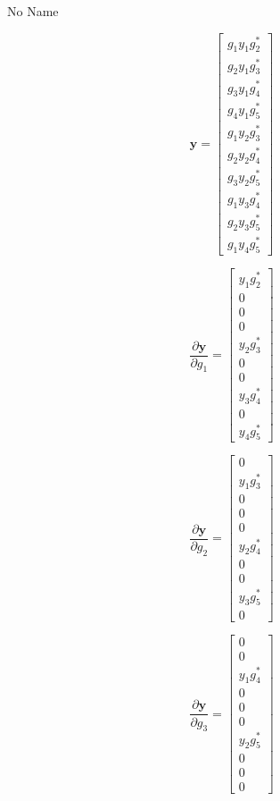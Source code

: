 \documentclass[a4paper,10pt]{article}
\begin{document}
\begin{section}{No Name}

\begin{equation}
\boldsymbol{y} = 
\begin{bmatrix}
 g_1 y_1 g_2^*\\
 g_2 y_1 g_3^*\\
 g_3 y_1 g_4^*\\
 g_4 y_1 g_5^*\\
 g_1 y_2 g_3^*\\
 g_2 y_2 g_4^*\\
 g_3 y_2 g_5^*\\
 g_1 y_3 g_4^*\\
 g_2 y_3 g_5^*\\
 g_1 y_4 g_5^*
\end{bmatrix}
\end{equation}

\begin{equation}
\frac{\partial\boldsymbol{y}}{\partial g_1} = 
\begin{bmatrix}
 y_1 g_2^*\\
 0\\
 0\\
 0\\
 y_2 g_3^*\\
 0\\
 0\\
 y_3 g_4^*\\
 0\\
 y_4 g_5^*
\end{bmatrix}
\end{equation}


\begin{equation}
\frac{\partial\boldsymbol{y}}{\partial g_2} = 
\begin{bmatrix}
 0\\
 y_1 g_3^*\\
 0\\
 0\\
 0\\
 y_2 g_4^*\\
 0\\
 0\\
 y_3 g_5^*\\
 0
\end{bmatrix}
\end{equation}

\begin{equation}
\frac{\partial\boldsymbol{y}}{\partial g_3} =  
\begin{bmatrix}
 0\\
 0\\
 y_1 g_4^*\\
 0\\
 0\\
 0\\
 y_2 g_5^*\\
 0\\
 0\\
 0
\end{bmatrix}
\end{equation}


\end{section}
\end{document}

